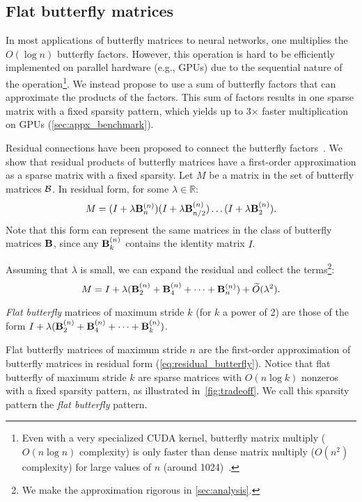 \subsection{Flat butterfly matrices}
\label{sec:flat_butterfly}
In most applications of butterfly matrices to neural networks, one multiplies
the $O(\log n)$ butterfly factors.
However, this operation is hard to be efficiently implemented on parallel hardware (e.g., GPUs) due to
the sequential nature of the operation\footnote{Even with a very specialized
  CUDA kernel, butterfly matrix multiply ($O(n \log n)$ complexity) is only
faster than dense matrix multiply ($O(n^2)$ complexity) for large values of $n$
(around 1024)~\citep{dao2019learning}.}.
We instead propose to use a sum of butterfly factors that can approximate the
products of the factors.
This sum of factors results in one sparse matrix with a fixed sparsity pattern,
which yields up to 3$\times$ faster multiplication on GPUs (\cref{sec:appx_benchmark}).

Residual connections have been proposed to connect the butterfly
factors~\citep{vahid2020butterfly}.
We show that residual products of butterfly matrices have a first-order
approximation as a sparse matrix with a fixed sparsity.
Let $M$ be a matrix in the set of butterfly matrices $\mathcal{B}$.
In residual form, for some $\lambda \in \mathbb{R}$:
\begin{equation}
  \label{eq:residual_butterfly}
  M = (I + \lambda \mathbf{B}_n^{(n)}) (I + \lambda \mathbf{B}_{n/2}^{(n)}) \dots (I + \lambda \mathbf{B}_2^{(n)}).
\end{equation}
Note that this form can represent the same matrices in the class of butterfly
matrices $\mathbf{B}$, since any $\mathbf{B}_k^{(n)}$ contains the identity matrix $I$.

Assuming that $\lambda$ is small, we can expand the residual and collect the
terms\footnote{We make the approximation rigorous in \cref{sec:analysis}.}:
\begin{equation*}
  M = I + \lambda (\mathbf{B}_2^{(n)} + \mathbf{B}_{4}^{(n)} + \dots + \mathbf{B}_n^{(n)}) + \widetilde{O}(\lambda^2).
\end{equation*}
\begin{definition}
  \label{def:flat_butterfly}
  \emph{Flat butterfly} matrices of maximum stride $k$ (for $k$ a power of 2)
  are those of the form $I + \lambda (\mathbf{B}_2^{(n)} + \mathbf{B}_{4}^{(n)} + \dots + \mathbf{B}_k^{(n)})$.
\end{definition}
Flat butterfly matrices of maximum stride $n$ are the first-order approximation
of butterfly matrices in residual form (\cref{eq:residual_butterfly}).
Notice that flat butterfly of maximum stride $k$ are sparse matrices with $O(n \log k)$ nonzeros with a fixed
sparsity pattern, as illustrated in~\cref{fig:tradeoff}.
We call this sparsity pattern the \emph{flat butterfly} pattern.

